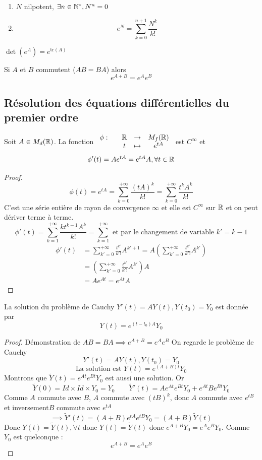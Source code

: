 \documentclass[]{report}
\begin{document}
\begin{ex}{}{}
\begin{enumerate}
        \item $N$ nilpotent, $\exists n\in \mathbb{N}^*,N^{n}=0$
        \item \[e^N=\sum_{k=0}^{n+1}\frac{N^k}{k!}\]
    \end{enumerate}
\end{ex}

\begin{prop}{}{}
    $\det (e^A)=e^{\text{tr} (A)}$
\end{prop}

\begin{prop}{}{}
    Si $A$ et $B$ commutent ($AB=BA$) alors
    \[e^{A+B}=e^A e^B\]
\end{prop}

\subsection{Résolution des équations différentielles du premier ordre}

\begin{prop}{}{}
    Soit $A\in M_d(\mathbb{R})$. La fonction $\begin{array}{ccccc} \phi : & & \mathbb{R} & \to & M_f(\mathbb{R}) \\ & & t & \mapsto & e^{tA} \end{array}$ est $C^{\infty}$ et
    \[\phi'(t)=Ae^{tA}=e^{tA}A,\forall t\in \mathbb{R}\]
\end{prop}

\begin{proof}{}{}
    \[\phi(t)=e^{tA}=\sum_{k=0}^{+\infty}\frac{(tA)^{k}}{k!}=\sum_{k=0}^{+\infty}\frac{t^k A^k}{k!}\]
    C'est une série entière de rayon de convergence $\infty$ et elle est $C^\infty$ sur $\mathbb{R}$ et on peut dériver terme à terme.
    \[\phi'(t)=\sum_{k=1}^{+\infty}\frac{k t^{k-1}A^k}{k!}=\sum_{k=1}^{+\infty}\text{ et par le changement de variable }k'=k-1\]
    \begin{align*}
        \phi'(t)&=\sum_{k'=0}^{+\infty}\frac{t^{k'}}{k'!}A^{k'+1}=A\left(\sum_{k'=0}^{+\infty}\frac{t^{k'}}{k'!}A^{k'}\right)\\
        &=\left(\sum_{k'=0}^{+\infty}\frac{t^{k'}}{k'!}A^{k'}\right)A\\
        &=Ae^{At}=e^{At}A
    \end{align*}
\end{proof}

\begin{cor}{}{}
    La solution du problème de Cauchy $Y'(t)=AY(t),Y(t_0)=Y_0$ est donnée par
    \[Y(t)=e^{(t-t_0)A}Y_0\]
\end{cor}

\begin{proof}{Démonstration de $AB=BA\implies e^{A+B}=e^A e^B$}{}
    On regarde le problème de Cauchy
    \[Y'(t)=AY(t),Y(t_0)=Y_0\]
    \[\text{La solution est }Y(t)=e^{(A+B)t}Y_0\]
    Montrons que $\widetilde{Y}(t)=e^{At}e^{Bt}Y_0$ est aussi une solution. Or
    \[\widetilde{Y}(0)=Id\times Id\times Y_0=Y_0\qquad \widetilde{Y}'(t)=Ae^{At}e^{Bt}Y_0+e^{At}Be^{Bt}Y_0\]
    Comme $A$ commute avec $B$, $A$ commute avec $(tB)^k$, donc $A$ commute avec $e^{tB}$ et inversement$B$ commute avec $e^{tA}$
    \[\implies \widetilde{Y}'(t)=(A+B)e^{tA}e^{tB}Y_0=(A+B)\widetilde{Y}(t)\]
    Donc $Y(t)=\widetilde{Y}(t),\forall t$ donc $Y(t)=\widetilde{Y}(t)$ donc $e^{A+B}Y_0=e^A e^B Y_0$. Comme $Y_0$ est quelconque :
    \[e^{A+B}=e^A e^B\]
\end{proof}
\end{document}
